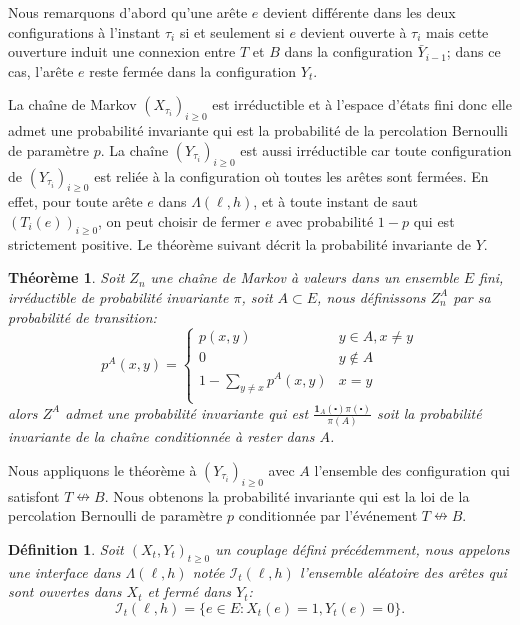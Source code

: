 \documentclass[titlepage,a4paper,12pt]{article}
\newcounter{def}
\newcounter{thm}
\newtheorem{interface}[def]{Définition}
\newtheorem{probainv}[thm]{Théorème}
\begin{document}
Nous remarquons d'abord qu'une arête $e$ devient différente dans les deux configurations à l'instant $\tau_i$ si et seulement si $e$ devient ouverte à $\tau_i$ mais cette ouverture induit une connexion entre $T$ et $B$ dans la configuration $\bar{Y}_{i-1}$; dans ce cas, l'arête $e$ reste fermée dans la configuration $Y_t$. 

La chaîne de Markov $(X_{\tau_i})_{i\geqslant 0}$ est irréductible et à l'espace d'états fini donc elle admet une probabilité invariante qui est la probabilité de la percolation Bernoulli de paramètre $p$. La chaîne $(Y_{\tau_i})_{i\geqslant 0}$ est aussi irréductible car toute configuration de $(Y_{\tau_i})_{i\geqslant 0}$ est reliée à la configuration où toutes les arêtes sont fermées. En effet, pour toute arête $e$ dans $\Lambda(\ell,h)$, et à toute instant de saut $(T_i(e))_{i\geqslant 0}$, on peut choisir de fermer $e$ avec probabilité $1-p$ qui est strictement positive. Le théorème suivant décrit la probabilité invariante de $Y$.

\begin{probainv}
Soit $Z_n$ une chaîne de Markov à valeurs dans un ensemble $E$ fini, irréductible de probabilité invariante $\pi$, soit $A\subset E$, nous définissons $Z_n^A$ par sa probabilité de transition:
$$p^A(x,y)=\left\lbrace \begin{array}{cc}
p(x,y) & y\in A, x\neq y \\
0 & y\notin A \\
1-\sum_{y\neq x}p^A(x,y) & x = y\\
\end{array}
\right.
$$
alors $Z^A$ admet une probabilité invariante qui est $\frac{\mathbf{1}_A(\centerdot)\pi(\centerdot)}{\pi(A)}$ soit la probabilité invariante de la chaîne conditionnée à rester dans $A$.
\end{probainv}

Nous appliquons le théorème à $(Y_{\tau_i})_{i\geqslant 0}$ avec $A$ l'ensemble des configuration qui satisfont $T\nleftrightarrow B$. Nous obtenons la probabilité invariante qui est la loi de la percolation Bernoulli de paramètre $p$ conditionnée par l'événement $T\nleftrightarrow B$.

\begin{interface}
Soit $(X_t,Y_t)_{t\geqslant 0}$ un couplage défini précédemment, nous appelons une interface dans $\Lambda({\ell,h})$ notée $\mathcal{I}_t({\ell,h})$ l'ensemble aléatoire des arêtes qui sont ouvertes dans $X_t$ et fermé dans $Y_t$: $$ \mathcal{I}_t({\ell,h}) = \big\{ e\in E: X_t(e) = 1, Y_t(e) = 0 \big\}.
$$
\end{interface}
\end{document}
